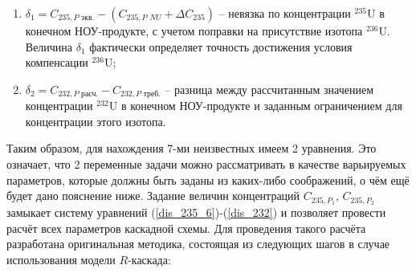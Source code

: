 \begin{enumerate}
    \item $\delta_{1}=C_{235,P\textit{ экв.}}-(C_{235,P\textit{ NU}}+\Delta C_{235})$ -- невязка по концентрации $^{235}$U в конечном НОУ-продукте, с учетом поправки на присутствие изотопа $^{236}$U. Величина $\delta_{1}$ фактически определяет точность достижения условия компенсации $^{236}$U;
    \item $\delta_{2}=C_{232,P\textit{ расч.}}-C_{232,P\textit{ треб.}}$ -- разница между рассчитанным значением концентрации $^{232}$U в конечном НОУ-продукте и заданным ограничением для концентрации этого изотопа.
\end{enumerate}

Таким образом, для нахождения 7-ми неизвестных имеем 2 уравнения. Это означает, что 2 переменные задачи можно рассматривать в качестве варьируемых параметров, которые должны быть заданы из каких-либо соображений, о чём ещё будет дано пояснение ниже. Задание величин концентраций $C_{235,{P_1}}$, $C_{235,{P_2}}$ замыкает систему уравнений (\ref{dis_235_6})-(\ref{dis_232}) и позволяет провести расчёт всех параметров каскадной схемы. Для проведения такого расчёта разработана оригинальная методика, состоящая из следующих шагов в случае использования модели $R$-каскада:

